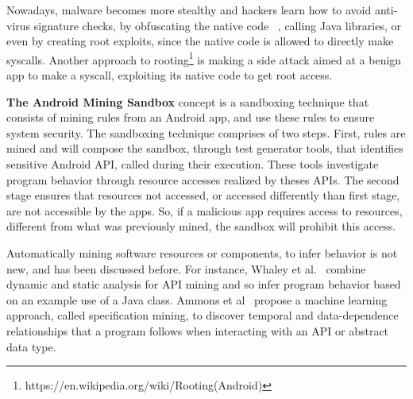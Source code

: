 Nowadays, malware becomes more stealthy and hackers learn how to avoid anti-virus signature checks, by obfuscating the native code~\cite{DBLP:journals/corr/abs-2002-04540}
, calling Java libraries, or even by creating root exploits, since the native code is allowed to directly make syscalls. Another approach to rooting\footnote{https://en.wikipedia.org/wiki/Rooting(Android)} is making a side attack aimed at a benign app to make a syscall, exploiting its native code to get root access.



\textbf{The Android Mining Sandbox} concept is a sandboxing technique that consists of mining rules from an Android app, and use these rules to ensure system security. The sandboxing technique comprises of two steps. First, rules are mined and will compose the sandbox,
through test generator tools, that identifies sensitive Android API, called during their execution. 
These tools investigate program behavior through resource accesses realized by theses APIs. The second stage ensures that resources not accessed, or accessed differently than first stage, are not accessible by the apps. So, if a malicious app requires access to resources, different from what was previously mined, the sandbox will prohibit this access.

Automatically mining software resources or components, to infer behavior is not new, and has been discussed before. For instance, Whaley et al.~\cite{DBLP:conf/issta/WhaleyML02} combine dynamic and static analysis for API mining and so infer program behavior based on an example use of a Java class. Ammons et al~\cite{DBLP:conf/popl/AmmonsBL02} propose a machine learning
approach, called specification mining, to discover temporal and data-dependence relationships that a program follows when interacting with an API or abstract data type.

